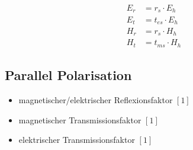 \begin{align*}
    E_{r} & = r_{s} \cdot E_{h}   \\
    E_{t} & = t_{e s} \cdot E_{h} \\
    H_{r} & = r_{s} \cdot H_{h}   \\
    H_{t} & = t_{m s} \cdot H_{h}
\end{align*}

\subsection{Parallel Polarisation}


\begin{itemize}
    \item magnetischer/elektrischer Reflexionsfaktor $[1]$
    \item magnetischer Transmissionsfaktor $[1]$
    \item elektrischer Transmissionsfaktor $[1]$
\end{itemize}

